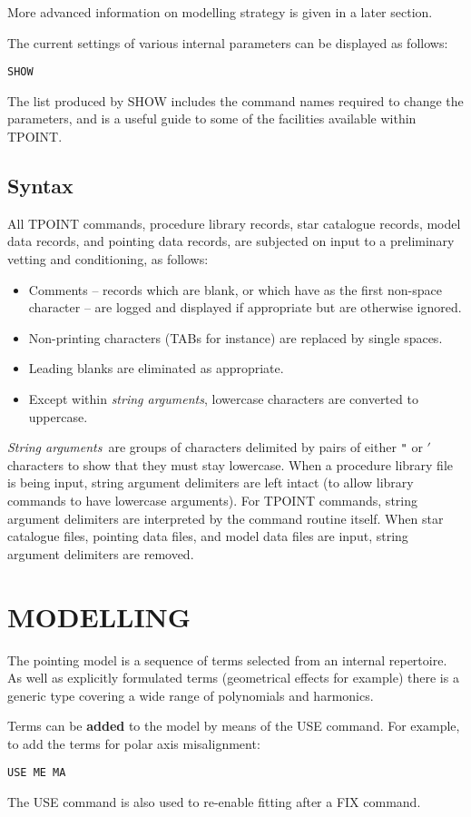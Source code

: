 More advanced information on modelling strategy is given in a later
section.

The current settings of various internal parameters can
be displayed as follows:
\begin{cmnds}
\> \> {\tt SHOW}
\end{cmnds}
The list produced by SHOW includes the command names required
to change the parameters, and is a useful guide to some of
the facilities available within TPOINT.

\subsection{Syntax}
All TPOINT commands, procedure library records, star
catalogue records, model data records, and pointing data
records, are subjected on input to a preliminary vetting and
conditioning, as follows:
\begin{itemize}
\item Comments -- records which are blank, or which
      have \fstring{!} as the first non-space character -- are
      logged and displayed if appropriate but are
      otherwise ignored.
\item Non-printing characters (TABs for instance) are
      replaced by single spaces.
\item Leading blanks are eliminated as appropriate.
\item Except within {\it string arguments}, lowercase
      characters are converted to uppercase.
\end{itemize}
{\it String arguments}\, are groups of characters delimited
by pairs of either \verb|"| or $'$ characters to show that
they must stay lowercase.
When
a procedure library file is being input, string argument
delimiters are left intact (to allow library commands to
have lowercase arguments).
For TPOINT commands, string argument
delimiters are interpreted by the command routine itself.  When
star catalogue files, pointing data files, and model data
files are input, string argument delimiters are removed.

\section{MODELLING}
The pointing model is a sequence of terms selected from an
internal repertoire.  As well as explicitly formulated terms
(geometrical effects for example) there is a generic type
covering a wide range of polynomials and harmonics.

Terms can be {\bf added} to the model by means of the USE command.
For example, to add the terms for polar axis misalignment:
\begin{cmnds}
\> \> {\tt USE ME MA}
\end{cmnds}
The USE command is also used to re-enable fitting after a
FIX command.

